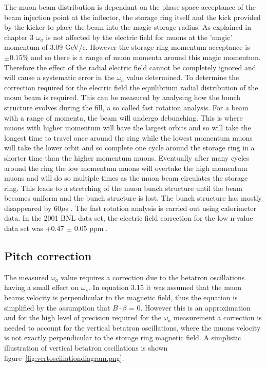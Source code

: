 The muon beam distribution is dependant on the phase space acceptance of the beam injection point at the inflector, the storage ring itself and the kick provided by the kicker to place the beam into the magic storage radius. As explained in chapter 3 $\omega_{a}$ is not affected by the electric field for muons at the 'magic' momentum of 3.09 GeV/c. However the storage ring momentum acceptance is $\pm{0.15}\%$ \cite{Reference29} and so there is a range of muon momenta around this magic momentum. Therefore the effect of the radial electric field cannot be completely ignored and will cause a systematic error in the $\omega_{a}$ value determined. To determine the correction required for the electric field the equilibrium radial distribution of the moun beam is required. This can be measured by analysing how the bunch structure evolves during the fill, a so called fast rotation analysis. For a beam with a range of momenta, the beam will undergo debunching. This is where muons with higher momentum will have the largest orbits and so will take the longest time to travel once around the ring while the lowest momentum muons will take the lower orbit and so complete one cycle around the storage ring in a shorter time than the higher momentum muons. Eventually after many cycles around the ring the low momentum muons will overtake the high momentum muons and will do so multiple times as the muon beam circulates the storage ring. This leads to a stretching of the muon bunch structure until the beam becomes uniform and the bunch structure is lost. The bunch structure has mostly disappeared by 60$\mu$s \cite{FR2}. 
The fast rotation analysis is carried out using calorimeter data. In the 2001 BNL data set, the electric field correction for the low n-value data set was +0.47 $\pm$ 0.05 ppm \cite{Reference13}.

\subsection{Pitch correction}

The measured $\omega_{a}$ value requires a correction due to the betatron oscillations having a small effect on $\omega_{s}$. In equation 3.15 it was assumed that the muon beams velocity is perpendicular to the magnetic field, thus the equation is simplified by the assumption that $B\cdot\beta$ = 0. However this is an approximation and for the high level of precision required for the $\omega_{a}$ measurement a correction is needed to account for the vertical betatron oscillations, where the muons velocity is not exactly perpendicular to the storage ring magnetic field. A simplistic illustration of vertical betatron oscillations is shown figure~\ref{fig:vertoscillationdiagram.png}.

